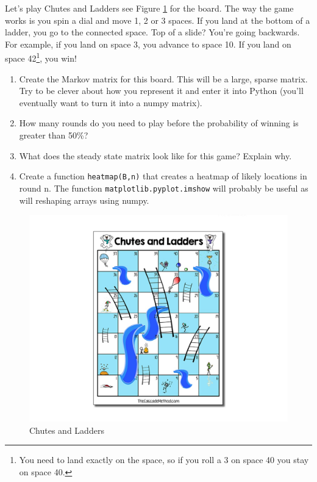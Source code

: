 \documentclass[11pt,letterpaper]{article}
\begin{document}
\begin{problem}
 Let's play Chutes and Ladders see Figure \ref{fig:chutes} for the board. The way the game works is you spin a dial and move 1, 2 or 3 spaces. If you land at the bottom of a ladder, you go to the connected space. Top of a slide? You're going backwards. For example, if you land on space 3, you advance to space 10. If you land on space 42\footnote{You need to land exactly on the space, so if you roll a 3 on space 40 you stay on space 40.}, you win! 
 
 \begin{enumerate}
  \item Create the Markov matrix for this board. This will be a large, sparse matrix. Try to be clever about how you represent it and enter it into Python (you'll eventually want to turn it into a numpy matrix).
  \item How many rounds do you need to play before the probability of winning is greater than 50\%?
  \item What does the steady state matrix look like for this game? Explain why.
  \item Create a function \texttt{heatmap(B,n)} that creates a heatmap of likely locations in round n. The function \texttt{matplotlib.pyplot.imshow} will probably be useful as will reshaping arrays using numpy.
 \end{enumerate}
 
 \begin{figure}[!h]
  \centering
  \includegraphics[width=1\textwidth]{images/chutes.jpg}
  \caption{Chutes and Ladders}
  \label{fig:chutes}
 \end{figure}
\end{problem}
\end{document}
